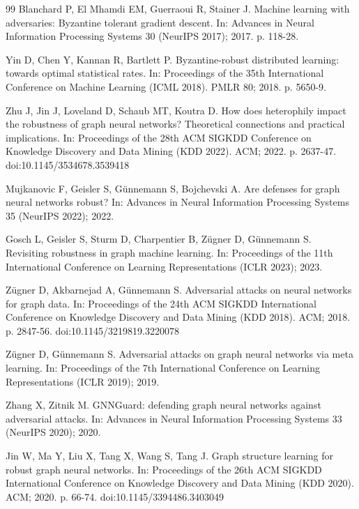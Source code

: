 \documentclass[fonts]{icst}
\theoremstyle{definition}
\begin{document}
\begin{thebibliography}{99}
Blanchard P, El Mhamdi EM, Guerraoui R, Stainer J. Machine learning with adversaries: Byzantine tolerant gradient descent. In: Advances in Neural Information Processing Systems 30 (NeurIPS 2017); 2017. p. 118-28.

Yin D, Chen Y, Kannan R, Bartlett P. Byzantine-robust distributed learning: towards optimal statistical rates. In: Proceedings of the 35th International Conference on Machine Learning (ICML 2018). PMLR 80; 2018. p. 5650-9.

Zhu J, Jin J, Loveland D, Schaub MT, Koutra D. How does heterophily impact the robustness of graph neural networks? Theoretical connections and practical implications. In: Proceedings of the 28th ACM SIGKDD Conference on Knowledge Discovery and Data Mining (KDD 2022). ACM; 2022. p. 2637-47. doi:10.1145/3534678.3539418

Mujkanovic F, Geisler S, G\"unnemann S, Bojchevski A. Are defenses for graph neural networks robust? In: Advances in Neural Information Processing Systems 35 (NeurIPS 2022); 2022.

Gosch L, Geisler S, Sturm D, Charpentier B, Z\"ugner D, G\"unnemann S. Revisiting robustness in graph machine learning. In: Proceedings of the 11th International Conference on Learning Representations (ICLR 2023); 2023.

Z\"ugner D, Akbarnejad A, G\"unnemann S. Adversarial attacks on neural networks for graph data. In: Proceedings of the 24th ACM SIGKDD International Conference on Knowledge Discovery and Data Mining (KDD 2018). ACM; 2018. p. 2847-56. doi:10.1145/3219819.3220078

Z\"ugner D, G\"unnemann S. Adversarial attacks on graph neural networks via meta learning. In: Proceedings of the 7th International Conference on Learning Representations (ICLR 2019); 2019.

Zhang X, Zitnik M. GNNGuard: defending graph neural networks against adversarial attacks. In: Advances in Neural Information Processing Systems 33 (NeurIPS 2020); 2020.

Jin W, Ma Y, Liu X, Tang X, Wang S, Tang J. Graph structure learning for robust graph neural networks. In: Proceedings of the 26th ACM SIGKDD International Conference on Knowledge Discovery and Data Mining (KDD 2020). ACM; 2020. p. 66-74. doi:10.1145/3394486.3403049


\end{thebibliography}
\end{document}
